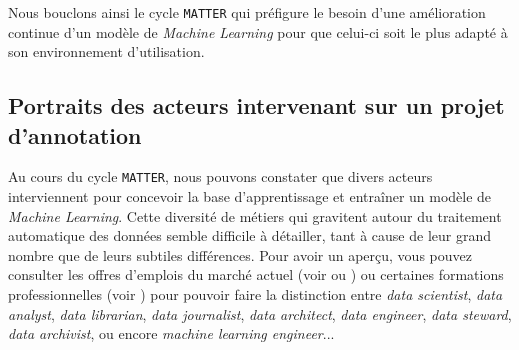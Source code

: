			Nous bouclons ainsi le cycle \texttt{MATTER} qui préfigure le besoin d'une amélioration continue d'un modèle de \textit{Machine Learning} pour que celui-ci soit le plus adapté à son environnement d'utilisation.
			
	
	\subsection{Portraits des acteurs intervenant sur un projet d'annotation}
	\label{section:2.2.2-ORGANISATION-ANNOTATION-ACTEURS}
	
		Au cours du cycle \texttt{MATTER}, nous pouvons constater que divers acteurs interviennent pour concevoir la base d'apprentissage et entraîner un modèle de \textit{Machine Learning}.
		Cette diversité de métiers qui gravitent autour du traitement automatique des données semble difficile à détailler, tant à cause de leur grand nombre que de leurs subtiles différences.
		Pour avoir un aperçu, vous pouvez consulter les offres d'emplois du marché actuel (voir \cite{team-datascientest:2022:metiers-data-mieux} ou \cite{databird:2023:10-metiers-data}) ou certaines formations professionnelles (voir \cite{isoz:2017:decouvrir-metiers-data}) pour pouvoir faire la distinction entre \textit{data scientist}, \textit{data analyst}, \textit{data librarian}, \textit{data journalist}, \textit{data architect}, \textit{data engineer}, \textit{data steward}, \textit{data archivist}, ou encore \textit{machine learning engineer}...
		
